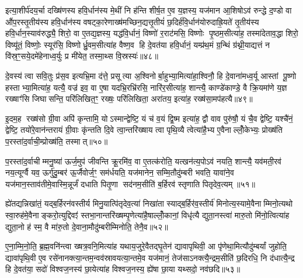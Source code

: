 इत्या॒शीर्प॑दय॒र्चा दख्षि॑णस्य हवि॒र्धान॑स्य मे॒थीं नि ह॑न्ति शीर्\mbox{}ष॒त ए॒व य॒ज्ञस्य॒ यज॑मान आ॒शिषोऽव॑ रुन्द्धे द॒ण्डो वा औ॑प॒रस्तृ॒तीय॑स्य हवि॒र्धान॑स्य वषट्का॒रेणाख्ष॑मच्छिन॒द्यत्तृ॒तीयं॑ छ॒दिर्\mbox{}ह॑वि॒र्धान॑योरुदाह्रि॒यते॑ तृ॒तीय॑स्य हवि॒र्धान॒स्याव॑रुद्ध्यै॒ शिरो॒ वा ए॒तद्य॒ज्ञस्य॒ यद्ध॑वि॒र्धानं॒ विष्णो॑ र॒राट॑मसि॒ विष्णोः पृ॒ष्ठम॒सीत्या॑ह॒ तस्मा॑देताव॒द्धा शिरो॒ विष्यू॑तं॒ विष्णोः॒ स्यूर॑सि॒ विष्णोर्ध्रु॒वम॒सीत्या॑ह वैष्ण॒व हि दे॒वत॑या हवि॒र्धानं॒ यम्प्र॑थ॒मं ग्र॒न्थिं ग्र॑थ्नी॒याद्यत्तं न वि॑स्र॒ꣳ॒सये॒दमे॑हेनाध्व॒र्युः प्र मी॑येत॒ तस्मा॒थ्स वि॒स्रस्यः॑॥४८॥

{\anuvakamend[{पत्नी॑ हन्युर्वा पृथि॒व्या विष्यू॑तं॒ विष्णोः॒ षड्विꣳ॑शतिश्च॥९॥}]}

दे॒वस्य॑ त्वा सवि॒तुः प्र॑स॒व इत्यभ्रि॒मा द॑त्ते॒ प्रसूत्या अ॒श्विनोर्बा॒हुभ्या॒मित्या॑हा॒श्विनौ॒ हि दे॒वाना॑मध्व॒र्यू आस्तां पू॒ष्णो हस्ताभ्या॒मित्या॑ह॒ यत्यै॒ वज्र॑ इव॒ वा ए॒षा यदभ्रि॒रभ्रि॑रसि॒ नारि॑र॒सीत्या॑ह॒ शान्त्यै॒ काण्डे॑काण्डे॒ वै क्रि॒यमा॑णे य॒ज्ञ रख्षाꣳ॑सि जिघासन्ति॒ परि॑लिखित॒ꣳ॒ रख्षः॒ परि॑लिखिता॒ अरा॑तय॒ इत्या॑ह॒ रख्ष॑सा॒मप॑हत्यै॥४९॥

इ॒दम॒ह रख्ष॑सो ग्री॒वा अपि॑ कृन्तामि॒ योऽस्मान्द्वेष्टि॒ यं च॑ व॒यं द्वि॒ष्म इत्या॑ह॒ द्वौ वाव पुरु॑षौ॒ यं चै॒व द्वेष्टि॒ यश्चै॑नं॒ द्वेष्टि॒ तयो॑रे॒वान॑न्तरायं ग्री॒वाः कृ॑न्तति दि॒वे त्वा॒न्तरि॑ख्षाय त्वा पृथि॒व्यै त्वेत्या॑है॒भ्य ए॒वैनाल्लोँ॒केभ्यः॒ प्रोख्ष॑ति प॒रस्ता॑द॒र्वाची॒म्प्रोख्ष॑ति॒ तस्मात्॥५०॥

प॒रस्ता॑द॒र्वाचीम्मनु॒ष्या॑ ऊर्ज॒मुप॑ जीवन्ति क्रू॒रमि॑व॒ वा ए॒तत्क॑रोति॒ यत्खन॑त्य॒पोऽव॑ नयति॒ शान्त्यै॒ यव॑मती॒रव॑ नय॒त्यूर्ग्वै यव॒ ऊर्गु॑दु॒म्बर॑ ऊ॒र्जैवोर्ज॒ꣳ॒ सम॑र्धयति॒ यज॑मानेन॒ सम्मि॒तौदु॑म्बरी भवति॒ यावा॑ने॒व यज॑मान॒स्ताव॑तीमे॒वास्मि॒न्नूर्जं॑ दधाति पितृ॒णा सद॑नम॒सीति॑ ब॒र्\mbox{}हिरव॑ स्तृणाति पितृदेव॒त्यम्॥५१॥

ह्ये॑तद्यन्निखा॑तं॒ यद्ब॒र्\mbox{}हिरन॑वस्तीर्य मिनु॒यात्पि॑तृदेव॒त्या॑ निखा॑ता स्याद्ब॒र्\mbox{}हिर॑व॒स्तीर्य॑ मिनोत्य॒स्यामे॒वैनाम्मिनो॒त्यथो स्वा॒रुह॑मे॒वैनाङ्करो॒त्युद्दिवꣵ॑ स्तभा॒नान्तरि॑ख्षम्पृ॒णेत्या॑है॒षाल्लोँ॒कानां॒ विधृ॑त्यै द्युता॒नस्त्वा॑ मारु॒तो मि॑नो॒त्वित्या॑ह द्युता॒नो ह॑ स्म॒ वै मा॑रु॒तो दे॒वाना॒मौदु॑म्बरीम्मिनोति॒ तेनै॒व॥५२॥

ए॒ना॒म्मि॒नो॒ति॒ ब्र॒ह्म॒वनि॑न्त्वा ख्षत्र॒वनि॒मित्या॑ह यथाय॒जुरे॒वैतद्घृ॒तेन॑ द्यावापृथिवी॒ आ पृ॑णेथा॒मित्यौदु॑म्बर्यां जुहोति॒ द्यावा॑पृथि॒वी ए॒व रसे॑नानक्त्या॒न्तम॒न्वव॑स्रावयत्या॒न्तमे॒व यज॑मानं॒ तेज॑साऽनक्त्यै॒न्द्रम॒सीति॑ छ॒दिरधि॒ नि द॑धात्यै॒न्द्र हि दे॒वत॑या॒ सदो॑ विश्वज॒नस्य॑ छा॒येत्या॑ह विश्वज॒नस्य॒ ह्ये॑षा छा॒या यथ्सदो॒ नव॑छदि॥५३॥

